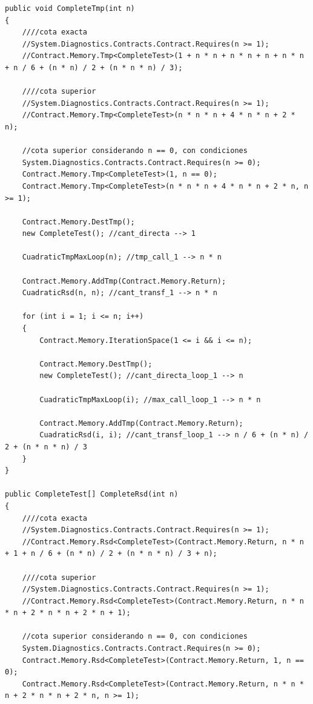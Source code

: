 \documentclass[12pt,a4paper]{article}
\begin{document}
			\vspace{15pt}
			\begin{footnotesize}
			\begin{lstlisting}[caption=Métodos con contratos con polinomios]
public void CompleteTmp(int n)
{
	////cota exacta
	//System.Diagnostics.Contracts.Contract.Requires(n >= 1);
	//Contract.Memory.Tmp<CompleteTest>(1 + n * n + n * n + n + n * n + n / 6 + (n * n) / 2 + (n * n * n) / 3);

	////cota superior
	//System.Diagnostics.Contracts.Contract.Requires(n >= 1);
	//Contract.Memory.Tmp<CompleteTest>(n * n * n + 4 * n * n + 2 * n);

	//cota superior considerando n == 0, con condiciones
	System.Diagnostics.Contracts.Contract.Requires(n >= 0);
	Contract.Memory.Tmp<CompleteTest>(1, n == 0);
	Contract.Memory.Tmp<CompleteTest>(n * n * n + 4 * n * n + 2 * n, n >= 1);

	Contract.Memory.DestTmp();
	new CompleteTest(); //cant_directa --> 1

	CuadraticTmpMaxLoop(n); //tmp_call_1 --> n * n

	Contract.Memory.AddTmp(Contract.Memory.Return);
	CuadraticRsd(n, n); //cant_transf_1 --> n * n

	for (int i = 1; i <= n; i++)
	{
		Contract.Memory.IterationSpace(1 <= i && i <= n);

		Contract.Memory.DestTmp();
		new CompleteTest(); //cant_directa_loop_1 --> n

		CuadraticTmpMaxLoop(i); //max_call_loop_1 --> n * n

		Contract.Memory.AddTmp(Contract.Memory.Return);
		CuadraticRsd(i, i); //cant_transf_loop_1 --> n / 6 + (n * n) / 2 + (n * n * n) / 3
	}
}

public CompleteTest[] CompleteRsd(int n)
{
	////cota exacta
	//System.Diagnostics.Contracts.Contract.Requires(n >= 1);
	//Contract.Memory.Rsd<CompleteTest>(Contract.Memory.Return, n * n + 1 + n / 6 + (n * n) / 2 + (n * n * n) / 3 + n);

	////cota superior
	//System.Diagnostics.Contracts.Contract.Requires(n >= 1);
	//Contract.Memory.Rsd<CompleteTest>(Contract.Memory.Return, n * n * n + 2 * n * n + 2 * n + 1);

	//cota superior considerando n == 0, con condiciones
	System.Diagnostics.Contracts.Contract.Requires(n >= 0);
	Contract.Memory.Rsd<CompleteTest>(Contract.Memory.Return, 1, n == 0);
	Contract.Memory.Rsd<CompleteTest>(Contract.Memory.Return, n * n * n + 2 * n * n + 2 * n, n >= 1);


\end{lstlisting}
\end{footnotesize}
\end{document}
